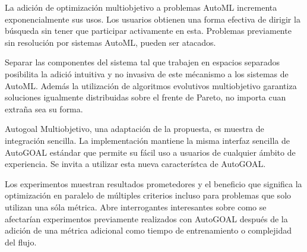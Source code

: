 \begin{conclusions}
    La adici\'on de optimizaci\'on multiobjetivo a problemas AutoML incrementa exponencialmente sus usos. Los usuarios obtienen una forma efectiva de dirigir la b\'usqueda sin tener que participar activamente en esta. Problemas previamente sin resoluci\'on por sistemas AutoML, pueden ser atacados.

    Separar las componentes del sistema tal que trabajen en espacios separados posibilita la adici\'o intuitiva y no invasiva de este m\'ecanismo a los sistemas de AutoML. Adem\'as la utilizaci\'on de algoritmos evolutivos multiobjetivo garantiza soluciones igualmente distribuidas sobre el frente de Pareto, no importa cuan extra\~na sea su forma.

    Autogoal Multiobjetivo, una adaptaci\'on de la propuesta, es muestra de integraci\'on sencilla. La implementaci\'on mantiene  la misma interfaz sencilla de AutoGOAL est\'andar que permite su f\'acil uso a usuarios de cualquier \'ambito de experiencia. Se invita a utilizar esta nueva caracter\'istca de AutoGOAL.

    Los experimentos muestran resultados prometedores y el beneficio que significa la optimizaci\'on en paralelo de m\'ultiples criterios incluso para problemas que solo utilizan una s\'ola m\'etrica.
    Abre interrogantes interesantes sobre como se afectar\'ian experimentos previamente realizados con AutoGOAL despu\'es de la adici\'on de una m\'etrica adicional como tiempo de entrenamiento o complejidad del flujo.





\end{conclusions}
